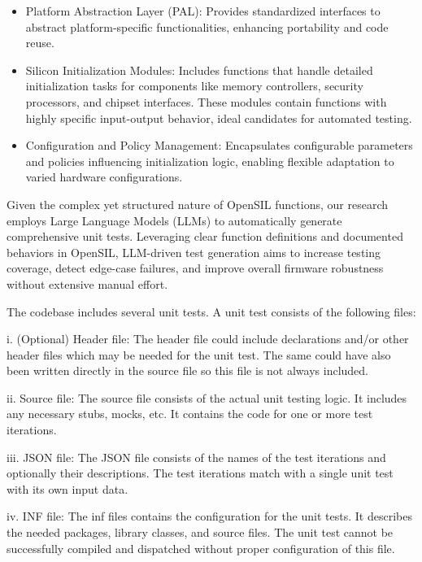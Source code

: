 \documentclass[conference]{IEEEtran}
\begin{document}
{\small
\begin{itemize}
\item Platform Abstraction Layer (PAL): Provides standardized interfaces to abstract platform-specific functionalities, enhancing portability and code reuse. 

\item Silicon Initialization Modules: Includes functions that handle detailed initialization tasks for components like memory controllers, security processors, and chipset interfaces. These modules contain functions with highly specific input-output behavior, ideal candidates for automated testing. 

\item Configuration and Policy Management: Encapsulates configurable parameters and policies influencing initialization logic, enabling flexible adaptation to varied hardware configurations. 

\end{itemize}
}

Given the complex yet structured nature of OpenSIL functions, our research employs Large Language Models (LLMs) to automatically generate comprehensive unit tests. Leveraging clear function definitions and documented behaviors in OpenSIL, LLM-driven test generation aims to increase testing coverage, detect edge-case failures, and improve overall firmware robustness without extensive manual effort. 

The codebase includes several unit tests. A unit test consists of the following files:

i. (Optional) Header file: The header file could include declarations and/or other header files which may be needed for the unit test. The same could have also been written directly in the source file so this file is not always included. 

ii. Source file: The source file consists of the actual unit testing logic. It includes any necessary stubs, mocks, etc. It contains the code for one or more test iterations. 

iii. JSON file: The JSON file consists of the names of the test iterations and optionally their descriptions. The test iterations match with a single unit test with its own input data. 

iv. INF file: The inf files contains the configuration for the unit tests. It describes the needed packages, library classes, and source files. The unit test cannot be successfully compiled and dispatched without proper configuration of this file. 
\end{document}
